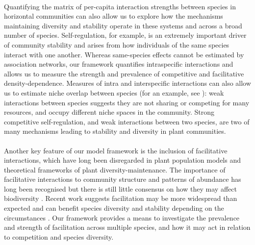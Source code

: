 \documentclass[a4,12pt]{article}
\begin{document}
    \paragraph{}
    Quantifying the matrix of per-capita interaction strengths between species in horizontal communities can also allow us to explore how the mechanisms maintaining diversity and stability operate in these systems and across a broad number of species. Self-regulation, for example, is an extremely important driver of community stability \parencite{Barabas2017} and arises from how individuals of the same species interact with one another. Whereas same-species effects cannot be estimated by association networks, our framework quantifies intraspecific interactions and allows us to measure the strength and prevalence of competitive and facilitative density-dependence. Measures of intra and interspecific interactions can also allow us to estimate niche overlap between species (for an example, see \cite{Chu2015a}): weak interactions between species suggests they are not sharing or competing for many resources, and occupy different niche spaces in the community. Strong competitive self-regulation, and weak interactions between two species, are two of many mechanisms leading to stability and diversity in plant communities.


        \paragraph{}
        Another key feature of our model framework is the inclusion of facilitative interactions, which have long been disregarded in plant population models and theoretical frameworks of plant diversity-maintenance. The importance of facilitative interactions to community structure and patterns of abundance has long been recognised \parencite{Callaway1997a} but there is still little consensus on how they may affect biodiversity \parencite{Bruno2003, Brooker2008a}. Recent work suggests facilitation may be more widespread than expected \parencite{Gross2015, Picoche2020} and can  benefit species diversity and stability depending on the circumstances \parencite{Coyte2015, Brooker2008}. Our framework provides a means to investigate the prevalence and strength of facilitation across multiple species, and how it may act in relation to competition and species diversity.  
        
\end{document}
